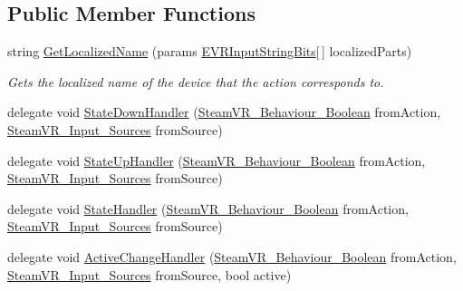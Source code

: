 \subsection*{Public Member Functions}
\begin{DoxyCompactItemize}
\item 
string \mbox{\hyperlink{class_valve_1_1_v_r_1_1_steam_v_r___behaviour___boolean_a971bb30542fc5f5da959fb951afdecbd}{Get\+Localized\+Name}} (params \mbox{\hyperlink{namespace_valve_1_1_v_r_a05e76187bbc5846b9bfb44f6acf13912}{E\+V\+R\+Input\+String\+Bits}}\mbox{[}$\,$\mbox{]} localized\+Parts)
\begin{DoxyCompactList}\small\item\em Gets the localized name of the device that the action corresponds to. \end{DoxyCompactList}\item 
delegate void \mbox{\hyperlink{class_valve_1_1_v_r_1_1_steam_v_r___behaviour___boolean_a72b8998f8432175c0bdeec28b33eeb48}{State\+Down\+Handler}} (\mbox{\hyperlink{class_valve_1_1_v_r_1_1_steam_v_r___behaviour___boolean}{Steam\+V\+R\+\_\+\+Behaviour\+\_\+\+Boolean}} from\+Action, \mbox{\hyperlink{namespace_valve_1_1_v_r_a82e5bf501cc3aa155444ee3f0662853f}{Steam\+V\+R\+\_\+\+Input\+\_\+\+Sources}} from\+Source)
\item 
delegate void \mbox{\hyperlink{class_valve_1_1_v_r_1_1_steam_v_r___behaviour___boolean_a6ac1e6383124de89a78d25b5f453bab7}{State\+Up\+Handler}} (\mbox{\hyperlink{class_valve_1_1_v_r_1_1_steam_v_r___behaviour___boolean}{Steam\+V\+R\+\_\+\+Behaviour\+\_\+\+Boolean}} from\+Action, \mbox{\hyperlink{namespace_valve_1_1_v_r_a82e5bf501cc3aa155444ee3f0662853f}{Steam\+V\+R\+\_\+\+Input\+\_\+\+Sources}} from\+Source)
\item 
delegate void \mbox{\hyperlink{class_valve_1_1_v_r_1_1_steam_v_r___behaviour___boolean_a915c126540f6be14cd925ac1679649af}{State\+Handler}} (\mbox{\hyperlink{class_valve_1_1_v_r_1_1_steam_v_r___behaviour___boolean}{Steam\+V\+R\+\_\+\+Behaviour\+\_\+\+Boolean}} from\+Action, \mbox{\hyperlink{namespace_valve_1_1_v_r_a82e5bf501cc3aa155444ee3f0662853f}{Steam\+V\+R\+\_\+\+Input\+\_\+\+Sources}} from\+Source)
\item 
delegate void \mbox{\hyperlink{class_valve_1_1_v_r_1_1_steam_v_r___behaviour___boolean_a4629d21a26e1e23cf5d7d6ddee6331ba}{Active\+Change\+Handler}} (\mbox{\hyperlink{class_valve_1_1_v_r_1_1_steam_v_r___behaviour___boolean}{Steam\+V\+R\+\_\+\+Behaviour\+\_\+\+Boolean}} from\+Action, \mbox{\hyperlink{namespace_valve_1_1_v_r_a82e5bf501cc3aa155444ee3f0662853f}{Steam\+V\+R\+\_\+\+Input\+\_\+\+Sources}} from\+Source, bool active)

\end{DoxyCompactItemize}
